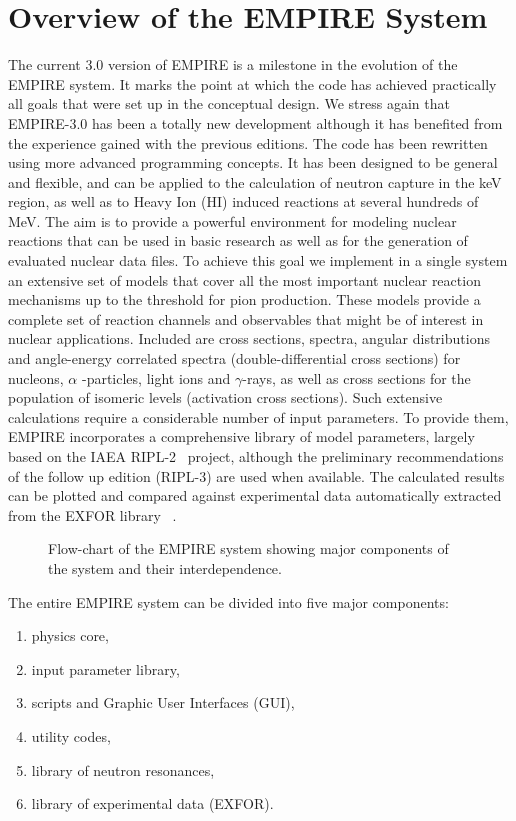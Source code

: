 \section{Overview of the EMPIRE System}

The current 3.0 version of EMPIRE is a milestone in the evolution of the
EMPIRE system. It marks the point at which the code has achieved practically
all goals that were set up in the conceptual design. We stress again that
EMPIRE-3.0 has been a totally new development although it has benefited from
the experience gained with the previous editions. The code has been
rewritten using more advanced programming concepts. It has been designed to
be general and flexible, and can be applied to the calculation of neutron
capture in the keV region, as well as to Heavy Ion (HI) induced reactions at
several hundreds of MeV. The aim is to provide a powerful environment for
modeling nuclear reactions that can be used in basic research as well as for
the generation of evaluated nuclear data files. To achieve this goal we
implement in a single system an extensive set of models that cover all
the most
important nuclear reaction mechanisms up to the threshold for pion
production. These models provide a complete set of reaction channels and
observables that might be of interest in nuclear applications. Included are
cross sections, spectra, angular distributions and angle-energy correlated
spectra (double-differential cross sections) for nucleons, $\alpha $%
-particles, light ions and $\gamma $-rays, as well as cross sections
for the
population of isomeric levels (activation cross sections). Such extensive
calculations require a considerable number of input parameters. To provide
them, EMPIRE incorporates a comprehensive library of model parameters,
largely based on the IAEA RIPL-2~\cite{RIPL2} project, although the
preliminary recommendations of the follow up edition (RIPL-3) are used when
available. The calculated results can be plotted and compared against
experimental data automatically extracted from the EXFOR library~\cite{EXFOR}%
.

\begin{figure*}[htbp]
\caption{Flow-chart of the EMPIRE system showing major components of the
system and their interdependence.}
\label{fig:empire-flowchart}
\end{figure*}

The entire EMPIRE system can be divided into five major components:

\begin{enumerate}
\item physics core,

\item input parameter library,

\item scripts and Graphic User Interfaces (GUI),

\item utility codes,

\item library of neutron resonances,

\item library of experimental data (EXFOR).
\end{enumerate}


